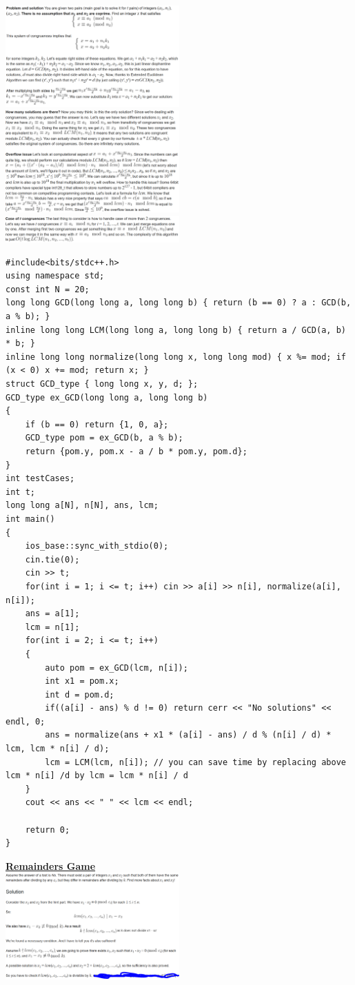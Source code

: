 \documentclass[8pt, a4paper, oneside, twocolumn]{extarticle}
\begin{document}
\includegraphics[width=0.5\textwidth,height=0.5\textheight,keepaspectratio]{crt}
\includegraphics[width=0.5\textwidth,height=0.5\textheight,keepaspectratio]{crt2}
\includegraphics[width=0.5\textwidth,height=0.5\textheight,keepaspectratio]{crt3}
\begin{verbatim}
#include<bits/stdc++.h>
using namespace std;
const int N = 20;
long long GCD(long long a, long long b) { return (b == 0) ? a : GCD(b, a % b); }
inline long long LCM(long long a, long long b) { return a / GCD(a, b) * b; }
inline long long normalize(long long x, long long mod) { x %= mod; if (x < 0) x += mod; return x; }
struct GCD_type { long long x, y, d; };
GCD_type ex_GCD(long long a, long long b)
{
    if (b == 0) return {1, 0, a};
    GCD_type pom = ex_GCD(b, a % b);
    return {pom.y, pom.x - a / b * pom.y, pom.d};
}
int testCases;
int t;
long long a[N], n[N], ans, lcm;
int main()
{
    ios_base::sync_with_stdio(0);
    cin.tie(0);
    cin >> t;
    for(int i = 1; i <= t; i++) cin >> a[i] >> n[i], normalize(a[i], n[i]);
    ans = a[1];
    lcm = n[1];
    for(int i = 2; i <= t; i++)
    {
        auto pom = ex_GCD(lcm, n[i]);
        int x1 = pom.x;
        int d = pom.d;
        if((a[i] - ans) % d != 0) return cerr << "No solutions" << endl, 0;
        ans = normalize(ans + x1 * (a[i] - ans) / d % (n[i] / d) * lcm, lcm * n[i] / d);
        lcm = LCM(lcm, n[i]); // you can save time by replacing above lcm * n[i] /d by lcm = lcm * n[i] / d
    }
    cout << ans << " " << lcm << endl;
 
    return 0;
}
\end{verbatim}
\href{https://codeforces.com/problemset/problem/687/B}{\textbf{Remainders Game}}\\
\includegraphics[width=0.5\textwidth,height=0.5\textheight,keepaspectratio]{rem}
\end{document}
